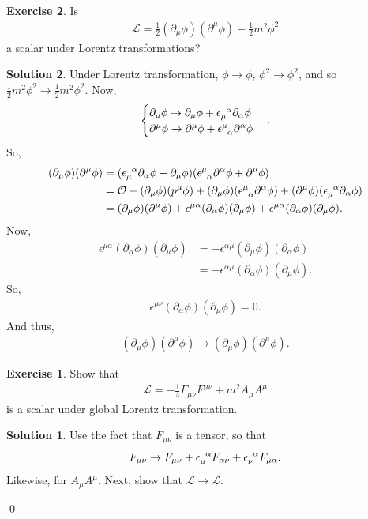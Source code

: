 \documentclass{book}
\numberwithin{equation}{section}
\theoremstyle{definition}
\newtheorem{exmp}{Exercise}[section]
\newtheorem{sln}{Solution}[section]
\newcommand{\p}{\partial}
\newcommand{\lag}{\mathcal{L}}
\newcommand{\f}[2]{\frac{#1}{#2}}
\begin{document}
\begin{exmp}
	Is
	\begin{align}
	\lag = \f{1}{2}(\p_\mu\phi)(\p^\mu\phi) - \f{1}{2}m^2\phi^2
	\end{align}
	 a scalar under Lorentz transformations? 
	 
	 \begin{sln}
	 	Under Lorentz transformation, $\phi \to \phi$, $\phi^2 \to \phi^2$, and so $\f{1}{2}m^2\phi^2 \to \f{1}{2}m^2\phi^2$. Now,
	 	\begin{align}
	 	\begin{cases}
	 	\p_\mu \phi \to \p_\mu\phi + \tensor{\epsilon}{_\mu^\alpha}\p_\alpha\phi\\
	 	\p^\mu\phi \to \p^\mu\phi + \tensor{\epsilon}{^\mu_\alpha}\p^\alpha \phi
	 	\end{cases}.
	 	\end{align}
	 	So,
	 	\begin{align}
	 	(\p_\mu\phi)(\p^\mu\phi)
	 	&= (\tensor{\epsilon}{_\mu^\alpha}\p_\alpha\phi + \p_\mu\phi)(\tensor{\epsilon}{^\mu_\alpha}\p^\alpha\phi + \p^\mu\phi)\\
	 	&= \mathcal{O} + (\p_\mu\phi)(p^\mu\phi) + (\p_\mu\phi)(\tensor{\epsilon}{^\mu_\alpha}\p^\alpha\phi) + (\p^\mu\phi)(\tensor{\epsilon}{_\mu^\alpha}\p_\alpha\phi)\\
	 	&= (\p_\mu\phi)(\p^\mu\phi) + \epsilon^{\mu\alpha}(\p_\alpha\phi)(\p_\mu\phi) + \epsilon^{\mu\alpha}(\p_\alpha\phi)(\p_\mu\phi).
	 	\end{align}
	 	Now,
	 	\begin{align}
	 	\epsilon^{\mu\alpha}(\p_\alpha\phi)(\p_\mu\phi) &= -\epsilon^{\alpha\mu}(\p_\mu\phi)(\p_\alpha\phi)\\
	 	&= -\epsilon^{\alpha\mu}(\p_\alpha\phi)(\p_\mu\phi).
	 	\end{align}
	 	So,
	 	\begin{align}
	 	\epsilon^{\mu\nu}(\p_\alpha\phi)(\p_\mu\phi) = 0.
	 	\end{align}
	 	And thus,
	 	\begin{align}
	 	(\p_\mu\phi)(\p^\mu\phi) \to (\p_\mu\phi)(\p^\mu\phi).
	 	\end{align}
	 	
	 	\begin{exmp}
	 		Show that
	 		\begin{align}
	 		\lag = -\f{1}{4}F_{\mu\nu}F^{\mu\nu} + m^2A_\mu A^\mu
	 		\end{align}
	 		is a scalar under global Lorentz transformation. 
	 		
	 		\begin{sln}
	 			Use the fact that $F_{\mu\nu}$ is a tensor, so that 
	 			\begin{align}
	 			F_{\mu\nu} \to F_{\mu\nu} + \tensor{\epsilon}{_\mu^\alpha}F_{\alpha\nu} + \tensor{\epsilon}{_\nu^\alpha}F_{\mu\alpha}.
	 			\end{align}
	 			Likewise, for $A_\mu A^\mu$. Next, show that $\lag \to \lag$. 
	 		\end{sln}\qed
	 	\end{exmp}
	 	
	 	
	 \end{sln}
\end{exmp} 
\end{document}
